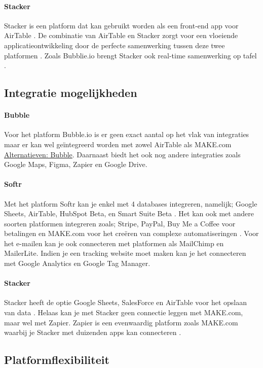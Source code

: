 \paragraph{Stacker}
Stacker is een platform dat kan gebruikt worden als een front-end app voor AirTable \autocite{Advice}. 
De combinatie van AirTable en Stacker zorgt voor een vloeiende applicatieontwikkeling door de perfecte samenwerking tussen deze twee platformen \autocite{Advice}. 
Zoals Bubblie.io brengt Stacker ook real-time samenwerking op tafel \autocite{Allen2020}.
\subsection{Integratie mogelijkheden}%
\label{subsec:integratie-mogelijkheden}
\paragraph{Bubble}
Voor het platform Bubble.io is er geen exact aantal op het vlak van integraties maar er kan wel geïntegreerd worden met zowel AirTable als MAKE.com \hyperref[subsec:bubble]{Alternatieven: Bubble}. 
Daarnaast biedt het ook nog andere integraties zoals Google Maps, Figma, Zapier en Google Drive.
\paragraph{Softr}
Met het platform Softr kan je enkel met 4 databases integreren, namelijk; Google Sheets, AirTable, HubSpot Beta, en Smart Suite Beta \autocite{Frater2024}. 
Het kan ook met andere soorten platformen integreren zoals; Stripe, PayPal, Buy Me a Coffee voor betalingen en MAKE.com voor het creëren van complexe automatiseringen \autocite{Code2023} \autocite{Youssef2023}. 
Voor het e-mailen kan je ook connecteren met platformen als MailChimp en MailerLite. Indien je een tracking website moet maken kan je het connecteren met Google Analytics en Google Tag Manager.
\paragraph{Stacker}
Stacker heeft de optie Google Sheets, SalesForce en AirTable voor het opslaan van data \autocite{Englert2021} \autocite{JDN2023} \autocite{Youssef2023}. 
Helaas kan je met Stacker geen connectie leggen met MAKE.com, maar wel met Zapier. 
Zapier is een evenwaardig platform zoals MAKE.com waarbij je Stacker met duizenden apps kan connecteren \autocite{Zapier}.
\subsection{Platformflexibiliteit}%
\label{subsec:platformflexibiliteit}

